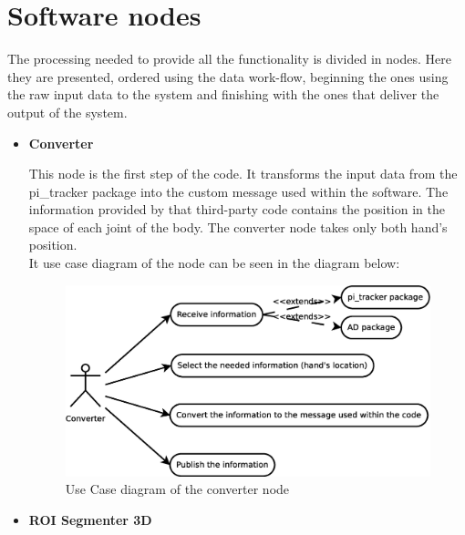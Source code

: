 \section{Software nodes}
\label{software_nodes}


The processing needed to provide all the functionality is divided in nodes. Here they are presented, ordered using the data work-flow, beginning the ones using the raw input data to the system and finishing with the ones that deliver the output of the system. 
\\

\begin{itemize}
	\item{\textbf{\large Converter}}\\
		\label{converter}

This node is the first step of the code. It transforms the input data from the pi\_tracker package into the custom message used within the software. The information provided by that third-party code contains the position in the space of each joint of the body. The converter node takes only both hand's position. 
\\

It use case diagram of the node can be seen in the diagram below: 

\begin{figure}[h]
	\begin{center}
\includegraphics[scale=0.2]{img/diagrams/uc_converter.eps}
	\caption[Use case diagram converter node]{Use Case diagram of the converter node}
	\end{center}
\end{figure}

	
	\item{\textbf{ROI Segmenter 3D}}\\
	\label{roi_segmenter_3d}


\end{itemize}
